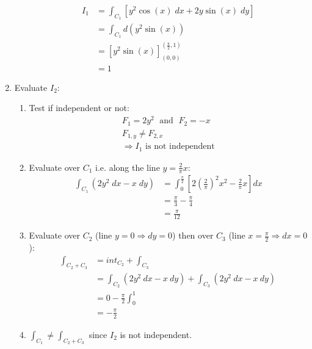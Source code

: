 \documentclass[10pt,a4paper]{article}
\begin{document}
\begin{enumerate}
\begin{enumerate}
        \begin{align*}
            I_1 &= \int_{C_1}\left[y^2\cos(x)\; dx + 2y\sin(x)\; dy\right] \\
            &= \int_{C_1} d(y^2\sin(x)) \\
            &= [y^2\sin(x)]_{(0,0)}^{(\frac{\pi}{2},1)} \\
            &= 1
        \end{align*}
    \end{enumerate}
    \item Evaluate $I_2$:
    \begin{enumerate}
        \item Test if independent or not:
        \begin{gather*}
            F_1 = 2y^2 \; \text{ and }\; F_2 = -x \\
            F_{1,y} \neq F_{2,x} \\
            \Rightarrow I_1 \text{ is not independent}
        \end{gather*}
        \item Evaluate over $C_1$ i.e. along the line $y=\frac{2}{\pi}x$:
        \begin{align*}
            \int_{C_1} (2y^2\; dx - x\; dy) &= \int_0^{\frac{\pi}{2}}\left[2\left(\frac{2}{\pi}\right)^2 x^2 - \frac{2}{\pi}x\right]dx \\ 
            &= \frac{\pi}{3} - \frac{\pi}{4} \\
            &= \frac{\pi}{12}
        \end{align*} 
        \item Evaluate over $C_2$ (line $y=0 \Rightarrow dy = 0$) then over $C_3$ (line
        $x=\frac{\pi}{2} \Rightarrow dx = 0$):
        \begin{align*}
            \int_{{C_2}+{C_3}} &= int_{C_2} + \int_{C_3} \\
            &= \int_{C_2}(2y^2\:dx - x\: dy) + \int_{C_3}(2y^2\:dx - x\: dy) \\
            &= 0 - \frac{\pi}{2}\int_0^1 \\
            &= -\frac{\pi}{2}
        \end{align*}
        \item $\int_{C_1}\neq \int_{{C_2}+{C_3}}$ since $I_2$ is not independent.
    \end{enumerate}
\end{enumerate}

\pagebreak
\end{document}
